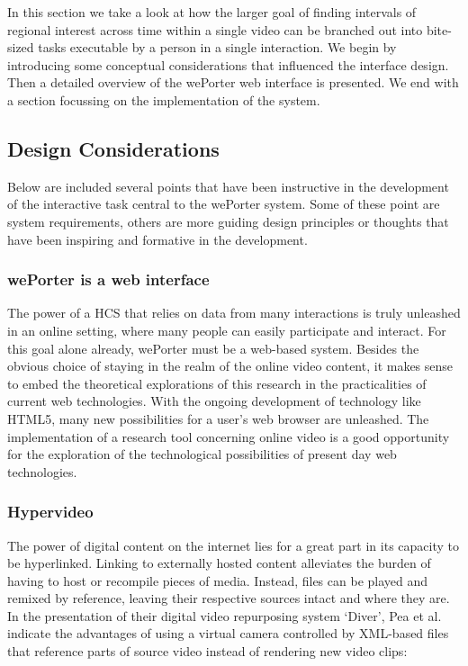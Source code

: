 In this section we take a look at how the larger goal of finding intervals of regional interest across time within a single video can be branched out into bite-sized tasks executable by a person in a single interaction. We begin by introducing some conceptual considerations that influenced the interface design. Then a detailed overview of the wePorter web interface is presented. We end with a  section focussing on the implementation of the system.

\subsection{Design Considerations}
Below are included several points that have been instructive in the development of the interactive task central to the wePorter system. Some of these point are system requirements, others are more guiding design principles or thoughts that have been inspiring and formative in the development.

\subsubsection{wePorter is a web interface}
The power of a HCS that relies on data from many interactions is truly unleashed in an online setting, where many people can easily participate and interact. For this goal alone already, wePorter must be a web-based system.
Besides the obvious choice of staying in the realm of the online video content, it makes sense to embed the theoretical explorations of this research in the practicalities of current web technologies. With the ongoing development of technology like HTML5, many new possibilities for a user's web browser are unleashed. The implementation of a research tool concerning online video is a good opportunity for the exploration of the technological possibilities of present day web technologies.

\subsubsection{Hypervideo}
The power of digital content on the internet lies for a great part in its capacity to be hyperlinked. Linking to externally hosted content alleviates the burden of having to host or recompile pieces of media. Instead, files can be played and remixed by reference, leaving their respective sources intact and where they are. In the presentation of their digital video repurposing system `Diver', Pea et al. indicate the advantages of using a virtual camera controlled by XML-based files that reference parts of source video instead of rendering new video clips\cite{Pea:2004td}:

